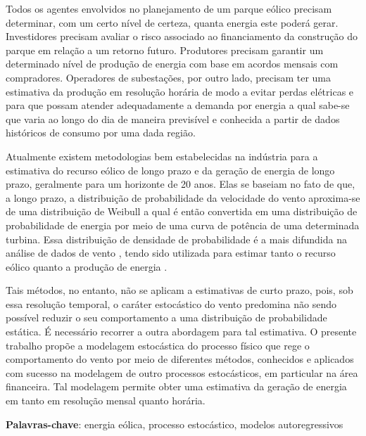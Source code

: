 \documentclass[
	12pt,				%
	openright,			%
	oneside,			%
	a4paper,			%
	english,			%
	french,				%
	spanish,			%
	brazil				%
	]{abntex2}
\begin{document}
\setlength{\absparsep}{18pt} %
\begin{resumo}
Todos os agentes envolvidos no planejamento de um parque eólico precisam determinar, com um certo nível de certeza, quanta energia este poderá gerar. Investidores precisam avaliar o risco associado ao financiamento da construção do parque em relação a um retorno futuro. Produtores precisam garantir um determinado nível de produção de energia com base em acordos mensais com compradores. Operadores de subestações, por outro lado, precisam ter uma estimativa da produção em resolução horária de modo a evitar perdas elétricas e para que possam atender adequadamente a demanda por energia a qual sabe-se que varia ao longo do dia de maneira previsível e conhecida a partir de dados históricos de consumo por uma dada região.


Atualmente existem metodologias bem estabelecidas na indústria para a estimativa do recurso eólico de longo prazo e da geração de energia de longo prazo, geralmente para um horizonte de 20 anos. Elas se baseiam no fato de que, a longo prazo, a distribuição de probabilidade da velocidade do vento aproxima-se de uma distribuição de Weibull \cite{weibull} a qual é então convertida em uma distribuição de probabilidade de energia por meio de uma curva de potência de uma determinada turbina. Essa distribuição de densidade de probabilidade é a mais difundida na análise de dados de vento \cite{art13},  tendo sido utilizada para estimar tanto o recurso eólico \cite{art14} quanto a produção de energia \cite{art15}.

Tais métodos, no entanto, não se aplicam a estimativas de curto prazo, pois, sob essa resolução temporal, o caráter estocástico do vento predomina não sendo possível reduzir o seu comportamento a uma distribuição de probabilidade estática. É necessário recorrer a outra abordagem para tal estimativa. O presente trabalho propõe a modelagem estocástica do processo físico que rege o comportamento do vento por meio de diferentes métodos, conhecidos e aplicados com sucesso na modelagem de outro processos estocásticos, em particular na área financeira. Tal modelagem permite obter uma estimativa da geração de energia em tanto em resolução mensal quanto horária.

 \textbf{Palavras-chave}: energia eólica, processo estocástico, modelos autoregressivos
\end{resumo}
\end{document}
